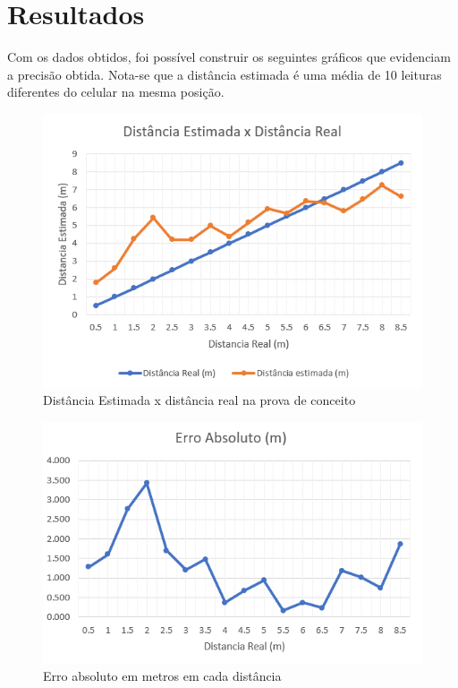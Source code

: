\section{Resultados}

Com os dados obtidos, foi possível construir os seguintes gráficos que evidenciam a precisão obtida.
Nota-se que a distância estimada é uma média de 10 leituras diferentes do celular na mesma posição.

\begin{figure}[H]
	\centering 
	\includegraphics[scale = 1]{images/grafico_distancias_1d.png}
	\caption{Distância Estimada x distância real na prova de conceito}
	\label{fig:grafico_distancia_1d}
\end{figure}

\begin{figure}[H]
	\centering 
	\includegraphics[scale = 1]{images/grafico_erro_1d.png}
	\caption{Erro absoluto em metros em cada distância}
	\label{fig:grafico_erro_1d}
\end{figure}

